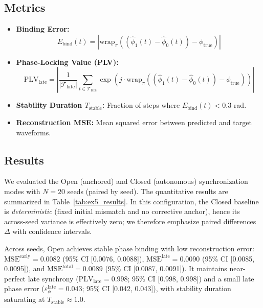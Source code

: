 \documentclass{article}
\begin{document}
\subsection{Metrics}
\begin{itemize}
    \item \textbf{Binding Error:}
    \begin{equation}
        E_{\text{bind}}(t) = \left| \text{wrap}_{\pi}\left( \left(\hat{\phi}_1(t) - \hat{\phi}_0(t)\right) - \phi_{\text{true}} \right) \right|
    \end{equation}
    \item \textbf{Phase-Locking Value (PLV):}
    \begin{equation}
        \text{PLV}_{\text{late}} = \left| \frac{1}{|\mathcal{T}_{\text{late}}|} \sum_{t \in \mathcal{T}_{\text{late}}} \exp\left( j \cdot \text{wrap}_{\pi}\left((\hat{\phi}_1(t) - \hat{\phi}_0(t)) - \phi_{\text{true}}\right) \right) \right|
    \end{equation}
    \item \textbf{Stability Duration $T_{\text{stable}}$:} Fraction of steps where $E_{\text{bind}}(t) < 0.3$ rad.
    \item \textbf{Reconstruction MSE:} Mean squared error between predicted and target waveforms.
\end{itemize}

\subsection{Results}
We evaluated the Open (anchored) and Closed (autonomous) synchronization modes with $N=20$ seeds (paired by seed).
The quantitative results are summarized in Table~\ref{tab:ex5_results}.
In this configuration, the Closed baseline is \emph{deterministic} (fixed initial mismatch and no corrective anchor), hence its across-seed variance is effectively zero; we therefore emphasize paired differences $\Delta$ with confidence intervals.



Across seeds, Open achieves stable phase binding with low reconstruction error:
$\mathrm{MSE}^{\mathrm{early}}=0.0082$ (95\% CI [0.0076, 0.0088]),
$\mathrm{MSE}^{\mathrm{late}}=0.0090$ (95\% CI [0.0085, 0.0095]),
and $\mathrm{MSE}^{\mathrm{total}}=0.0089$ (95\% CI [0.0087, 0.0091]).
It maintains near-perfect late synchrony ($\mathrm{PLV}_{\mathrm{late}}=0.998$; 95\% CI [0.998, 0.998]) and a small late phase error ($\varepsilon_{\phi}^{\mathrm{late}}=0.043$; 95\% CI [0.042, 0.043]), with stability duration saturating at $T_{\mathrm{stable}} \approx 1.0$.
\end{document}

